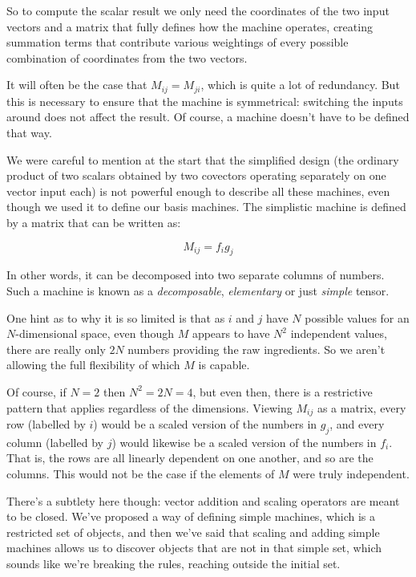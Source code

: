 So to compute the scalar result we only need the coordinates of the two input vectors and a matrix that fully defines how the machine operates, creating summation terms that contribute various weightings of every possible combination of coordinates from the two vectors.

It will often be the case that $M_{ij} = M_{ji}$, which is quite a lot of redundancy. But this is necessary to ensure that the machine is symmetrical: switching the inputs around does not affect the result. Of course, a machine doesn't have to be defined that way.

We were careful to mention at the start that the simplified design (the ordinary product of two scalars obtained by two covectors operating separately on one vector input each) is not powerful enough to describe all these machines, even though we used it to define our basis machines. The simplistic machine is defined by a matrix that can be written as:

$$
M_{ij} = f_i g_j
$$

In other words, it can be decomposed into two separate columns of numbers. Such a machine is known as a \textit{decomposable}, \textit{elementary} or just \textit{simple} tensor.

One hint as to why it is so limited is that as $i$ and $j$ have $N$ possible values for an $N$-dimensional space, even though $M$ appears to have $N^2$ independent values, there are really only $2N$ numbers providing the raw ingredients. So we aren't allowing the full flexibility of which $M$ is capable.

Of course, if $N=2$ then $N^2 = 2N = 4$, but even then, there is a restrictive pattern that applies regardless of the dimensions. Viewing $M_{ij}$ as a matrix, every row (labelled by $i$) would be a scaled version of the numbers in $g_j$, and every column (labelled by $j$) would likewise be a scaled version of the numbers in $f_i$. That is, the rows are all linearly dependent on one another, and so are the columns. This would not be the case if the elements of $M$ were truly independent.

There's a subtlety here though: vector addition and scaling operators are meant to be closed. We've proposed a way of defining simple machines, which is a restricted set of objects, and then we've said that scaling and adding simple machines allows us to discover objects that are not in that simple set, which sounds like we're breaking the rules, reaching outside the initial set.

